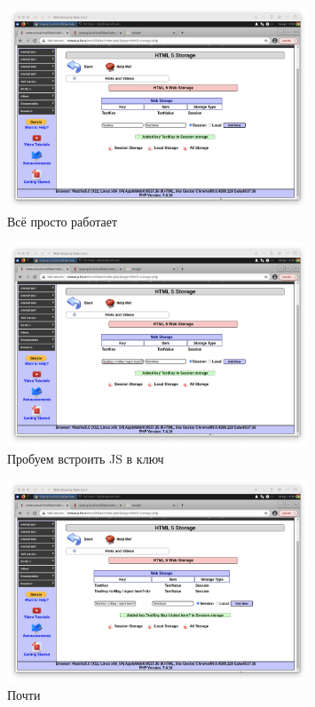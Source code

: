 \documentclass[a4paper]{article}
\begin{document}
  \begin{figure}[H]
    \centering
    \includegraphics[width=0.8\textwidth]{step_00035}
    \caption{Всё просто работает}
  \end{figure}

  \begin{figure}[H]
    \centering
    \includegraphics[width=0.8\textwidth]{step_00036}
    \caption{Пробуем встроить JS в ключ}
  \end{figure}

  \begin{figure}[H]
    \centering
    \includegraphics[width=0.8\textwidth]{step_00037}
    \caption{Почти}
  \end{figure}
\end{document}
